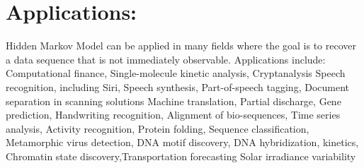 \documentclass[10pt,a4paper,twoside]{article}
\begin{document}
\section{Applications:}
Hidden Markov Model can be applied in many fields where the goal is to recover a data sequence that is not immediately observable. Applications include: Computational finance, Single-molecule kinetic analysis, Cryptanalysis Speech recognition, including Siri, Speech synthesis, Part-of-speech tagging, Document separation in scanning solutions Machine translation, Partial discharge, Gene prediction, Handwriting recognition, Alignment of bio-sequences, Time series analysis, Activity recognition, Protein folding, Sequence classification, Metamorphic virus detection, DNA motif discovery, DNA hybridization, kinetics, Chromatin state discovery,Transportation forecasting Solar irradiance variability 
\end{document}

